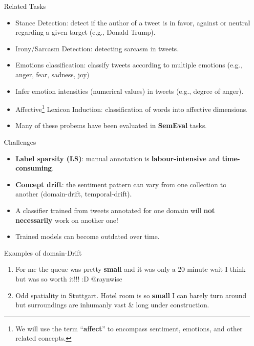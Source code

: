 \documentclass[handout]{beamer}
\begin{document}
\begin{frame}{Related Tasks}

\begin{itemize}

  \item Stance Detection: detect if the author of a tweet is in favor, against or neutral regarding a given target (e.g., Donald Trump). 
   \item Irony/Sarcasm Detection: detecting sarcasm in tweets.
   \item Emotions classification: classify tweets according to multiple emotions (e.g., anger, fear, sadness, joy)
   \item  Infer emotion intensities (numerical values) in tweets (e.g., degree of anger).
   \item Affective\footnote{We will use the term ``\textbf{affect}'' to encompass sentiment, emotions, and other related concepts.} Lexicon Induction: classification of words into affective dimensions. 

\item Many of these probems have been evaluated in \textbf{SemEval} tasks.

\end{itemize}


\end{frame}



\begin{frame}{Challenges}
\begin{scriptsize}
  \begin{itemize}
   \item \textbf{Label sparsity (LS)}: manual annotation is \textbf{labour-intensive} and \textbf{time-consuming}. 
   \item \textbf{Concept drift}: the sentiment pattern can vary from one collection to another (domain-drift, temporal-drift).
 
 \item A classifier trained from tweets annotated for one domain will \textbf{not necessarily} work on another one! 
\item Trained models can become outdated over time.
  \end{itemize} 



\begin{block}{Examples of domain-Drift}
\begin{enumerate}
\item  For me the queue was pretty \textcolor[rgb]{0.00,0.00,1.00}{\textbf{small}} and it was only a 20 minute wait I think but was so worth it!!! :D @raynwise
\item Odd spatiality in Stuttgart. Hotel room is so  \textcolor[rgb]{1.00,0.00,0.00}{\textbf{small}} I can barely turn around but surroundings are inhumanly vast \& long under construction.
\end{enumerate}
\end{block}


\end{scriptsize}

\end{frame}
\end{document}
